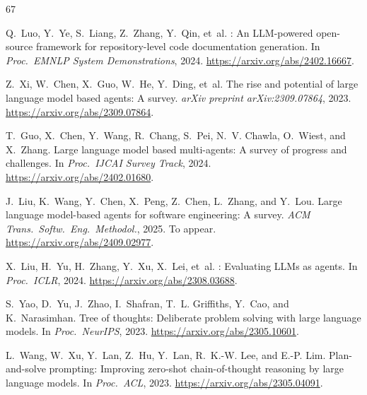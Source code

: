 \documentclass[11pt,a4paper]{article}
\begin{document}
\begin{thebibliography}{67}

Q.~Luo, Y.~Ye, S.~Liang, Z.~Zhang, Y.~Qin, et~al.
: An {LLM}-powered open-source framework for repository-level code documentation generation.
\newblock In \emph{Proc.\ EMNLP System Demonstrations}, 2024.
\newblock \url{https://arxiv.org/abs/2402.16667}.


Z.~Xi, W.~Chen, X.~Guo, W.~He, Y.~Ding, et~al.
\newblock The rise and potential of large language model based agents: A survey.
\newblock \emph{arXiv preprint arXiv:2309.07864}, 2023.
\newblock \url{https://arxiv.org/abs/2309.07864}.

T.~Guo, X.~Chen, Y.~Wang, R.~Chang, S.~Pei, N.~V. Chawla, O.~Wiest, and X.~Zhang.
\newblock Large language model based multi-agents: A survey of progress and challenges.
\newblock In \emph{Proc.\ IJCAI Survey Track}, 2024.
\newblock \url{https://arxiv.org/abs/2402.01680}.

J.~Liu, K.~Wang, Y.~Chen, X.~Peng, Z.~Chen, L.~Zhang, and Y.~Lou.
\newblock Large language model-based agents for software engineering: A survey.
\newblock \emph{ACM Trans.\ Softw.\ Eng.\ Methodol.}, 2025. To appear.
\newblock \url{https://arxiv.org/abs/2409.02977}.

X.~Liu, H.~Yu, H.~Zhang, Y.~Xu, X.~Lei, et~al.
: Evaluating {LLM}s as agents.
\newblock In \emph{Proc.\ ICLR}, 2024.
\newblock \url{https://arxiv.org/abs/2308.03688}.


S.~Yao, D.~Yu, J.~Zhao, I.~Shafran, T.~L. Griffiths, Y.~Cao, and K.~Narasimhan.
\newblock Tree of thoughts: Deliberate problem solving with large language models.
\newblock In \emph{Proc.\ NeurIPS}, 2023.
\newblock \url{https://arxiv.org/abs/2305.10601}.

L.~Wang, W.~Xu, Y.~Lan, Z.~Hu, Y.~Lan, R.~K.-W. Lee, and E.-P. Lim.
\newblock Plan-and-solve prompting: Improving zero-shot chain-of-thought reasoning by large language models.
\newblock In \emph{Proc.\ ACL}, 2023.
\newblock \url{https://arxiv.org/abs/2305.04091}.


\end{thebibliography}
\end{document}
